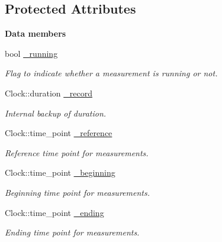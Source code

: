 \subsection*{Protected Attributes}
\begin{Indent}{\bf Data members}\par
\begin{DoxyCompactItemize}
\item 
bool \hyperlink{exceptionmagrathea_1_1Timer_a633b668aeba423f9d6229bce33267226}{\-\_\-running}
\begin{DoxyCompactList}\small\item\em Flag to indicate whether a measurement is running or not. \end{DoxyCompactList}\item 
Clock\-::duration \hyperlink{exceptionmagrathea_1_1Timer_a1fb0110e524e12e39685ef9e5312d3f4}{\-\_\-record}
\begin{DoxyCompactList}\small\item\em Internal backup of duration. \end{DoxyCompactList}\item 
Clock\-::time\-\_\-point \hyperlink{exceptionmagrathea_1_1Timer_ad08277afa11789b6ea4cb88ed9f7c28b}{\-\_\-reference}
\begin{DoxyCompactList}\small\item\em Reference time point for measurements. \end{DoxyCompactList}\item 
Clock\-::time\-\_\-point \hyperlink{exceptionmagrathea_1_1Timer_a6c71f8b0c5557836e48043ff6bad791d}{\-\_\-beginning}
\begin{DoxyCompactList}\small\item\em Beginning time point for measurements. \end{DoxyCompactList}\item 
Clock\-::time\-\_\-point \hyperlink{exceptionmagrathea_1_1Timer_a005c041aa6b61e1f6c365fa6c4d7151d}{\-\_\-ending}
\begin{DoxyCompactList}\small\item\em Ending time point for measurements. \end{DoxyCompactList}\end{DoxyCompactItemize}
\end{Indent}
